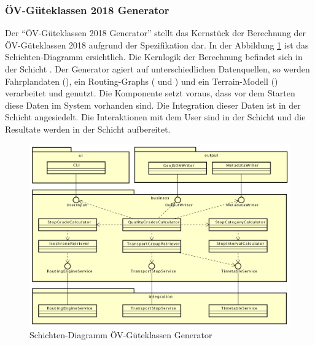 \subsubsection{ÖV-Güteklassen 2018 Generator}
\label{container:generator}

Der "`\gls{ÖV-Güteklassen} 2018 Generator"' stellt das Kernstück der Berechnung der \gls{ÖV-Güteklassen} 2018 aufgrund der Spezifikation dar.
In der Abbildung \ref{fig:layer_diagram_generator} ist das Schichten-Diagramm ersichtlich.
Die Kernlogik der Berechnung befindet sich in der Schicht \emph{}.
Der Generator agiert auf unterschiedlichen Datenquellen, so werden Fahrplandaten (), ein \glspl{Routing-Graph} ( und ) und ein Terrain-Modell () verarbeitet und genutzt.
Die Komponente setzt voraus, dass vor dem Starten diese Daten im System vorhanden sind.
Die Integration dieser Daten ist in der Schicht \emph{} angesiedelt.
Die Interaktionen mit dem User sind in der Schicht \emph{} und die Resultate werden in der Schicht \emph{} aufbereitet.

\begin{figure}[ht]
    \centering
    \includegraphics[width=1.0\linewidth]{projectdoc/img/guetklassen_generator_architektur.png}
    \caption[Schichten-Diagramm ÖV-Güteklassen Generator]{Schichten-Diagramm ÖV-Güteklassen Generator}
    \label{fig:layer_diagram_generator}
\end{figure}

